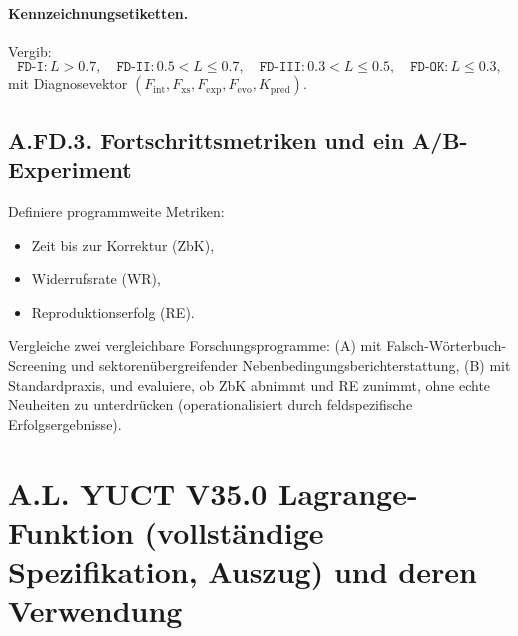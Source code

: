 \documentclass[13pt,a4paper]{article}
\newcommand{\Kpred}{K_{\mathrm{pred}}}
\begin{document}
	\paragraph{Kennzeichnungsetiketten.}
	Vergib:
	\[ \texttt{FD-I}: L>0.7,\quad
	\texttt{FD-II}: 0.5<L\le0.7,\quad
	\texttt{FD-III}: 0.3<L\le0.5,\quad
	\texttt{FD-OK}: L\le0.3, \]
	mit Diagnosevektor $(F_{\mathrm{int}},F_{\mathrm{xs}},F_{\mathrm{exp}},F_{\mathrm{evo}},\Kpred)$.
	
	\subsection*{A.FD.3. Fortschrittsmetriken und ein A/B-Experiment}
	Definiere programmweite Metriken:
	\begin{itemize}[leftmargin=*]
		\item Zeit bis zur Korrektur (ZbK),
		\item Widerrufsrate (WR),
		\item Reproduktionserfolg (RE).
	\end{itemize}
	Vergleiche zwei vergleichbare Forschungsprogramme: (A) mit Falsch-Wörterbuch-Screening und sektorenübergreifender Nebenbedingungsberichterstattung, (B) mit Standardpraxis, und evaluiere, ob ZbK abnimmt und RE zunimmt, ohne echte Neuheiten zu unterdrücken (operationalisiert durch feldspezifische Erfolgsergebnisse).
	
	\section*{A.L. YUCT V35.0 Lagrange-Funktion (vollständige Spezifikation, Auszug) und deren Verwendung}
	
\end{document}
